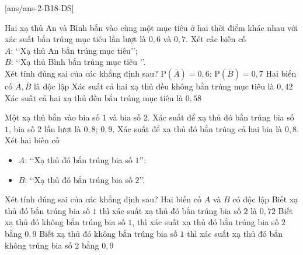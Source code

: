 {}[ans/ans-2-B18-DS]
\begin{ex}%
	Hai xạ thủ An và Bình bắn vào cùng một mục tiêu ở hai thời điểm khác nhau với xác suất bắn trúng mục tiêu lần lượt là $0{,}6$ và $0{,}7$. Xét các biến cố\\ 
	$A$: \lq\lq  Xạ thủ An bắn trúng mục tiêu\rq\rq;\\
	$B$: \lq\lq  Xạ thủ Bình bắn trúng mục tiêu \rq\rq.\\
	Xét tính đúng sai của các khẳng định sau?
	\choiceTF
	{$\mathrm{P}(\overline{A})=0{,}6$; $\mathrm{P}(\overline{B})=0{,}7$}
	{\True Hai biến cố $\overline{A}, \overline{B}$ là độc lập}
	{Xác suất cả hai xạ thủ đều không bắn trúng mục tiêu là $0{,}42$}
	{Xác suất cả hai xạ thủ đều bắn trúng mục tiêu là $0{,}58$}
\end{ex}
\begin{ex}%
	Một xạ thủ bắn vào bia số $1$ và bia số $2$. Xác suất để xạ thủ đó bắn trúng bia số $1$, bia số $2$ lần lượt là $0{,}8$; $0{,}9$. Xác suất để xạ thủ đó bắn trúng cả hai bia là $0{,}8$. Xét hai biến cố
	\begin{itemize}
	\item $A$: \lq\lq  Xạ thủ đó bắn trúng bia số $1$\rq\rq;
	\item $B$: \lq\lq  Xạ thủ đó bắn trúng bia số $2$\rq\rq.
	\end{itemize}
	Xét tính đúng sai của các khẳng định sau?
	\choiceTF
	{Hai biến cố $A$ và $B$ có độc lập}
	{Biết xạ thủ đó bắn trúng bia số $1$ thì xác suất xạ thủ đó bắn trúng bia số $2$ là $0{,}72$}
	{\True Biết xạ thủ đó không bắn trúng bia số $1$, thì xác suất xạ thủ đó bắn trúng bia số $2$ bằng $0{,}9$}
	{Biết xạ thủ đó không bắn trúng bia số $1$ thì xác suất xạ thủ đó bắn không trúng bia số $2$ bằng $0{,}9$}
\end{ex}
